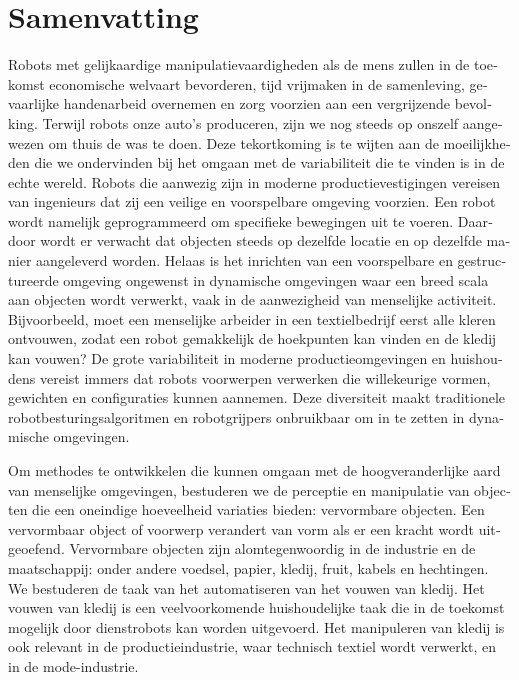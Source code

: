\documentclass[\home/main.tex]{subfiles}
\begin{document}
\chapter{Samenvatting}

\begin{otherlanguage}{dutch}

Robots met gelijkaardige manipulatievaardigheden als de mens zullen in de toekomst economische welvaart bevorderen, tijd vrijmaken in de samenleving, gevaarlijke handenarbeid overnemen en zorg voorzien aan een vergrijzende bevolking. 
Terwijl robots onze auto's produceren, zijn we nog steeds op onszelf aangewezen om thuis de was te doen.
Deze tekortkoming is te wijten aan de moeilijkheden die we ondervinden bij het omgaan met de variabiliteit die te vinden is in de echte wereld.
Robots die aanwezig zijn in moderne productievestigingen vereisen van ingenieurs dat zij een veilige en voorspelbare omgeving voorzien. Een robot wordt namelijk geprogrammeerd om specifieke bewegingen uit te voeren. Daardoor wordt er verwacht dat objecten steeds op dezelfde locatie en op dezelfde manier aangeleverd worden.
Helaas is het inrichten van een voorspelbare en gestructureerde omgeving ongewenst in dynamische omgevingen waar een breed scala aan objecten wordt verwerkt, vaak in de aanwezigheid van menselijke activiteit. Bijvoorbeeld, moet een menselijke arbeider in een textielbedrijf eerst alle kleren ontvouwen, zodat een robot gemakkelijk de hoekpunten kan vinden en de kledij kan vouwen?
De grote variabiliteit in moderne productieomgevingen en huishoudens vereist immers dat robots voorwerpen verwerken die willekeurige vormen, gewichten en configuraties kunnen aannemen. Deze diversiteit maakt traditionele robotbesturingsalgoritmen en robotgrijpers onbruikbaar om in te zetten in dynamische omgevingen.

Om methodes te ontwikkelen die kunnen omgaan met de hoogveranderlijke aard van menselijke omgevingen, bestuderen we de perceptie en manipulatie van objecten die een oneindige hoeveelheid variaties bieden: vervormbare objecten. Een vervormbaar object of voorwerp verandert van vorm als er een kracht wordt uitgeoefend. Vervormbare objecten zijn alomtegenwoordig in de industrie en de maatschappij: onder andere voedsel, papier, kledij, fruit, kabels en hechtingen. We bestuderen de taak van het automatiseren van het vouwen van kledij. Het vouwen van kledij is een veelvoorkomende huishoudelijke taak die in de toekomst mogelijk door dienstrobots kan worden uitgevoerd. Het manipuleren van kledij is ook relevant in de productieindustrie, waar technisch textiel wordt verwerkt, en in de mode-industrie.


\end{otherlanguage}
\end{document}
